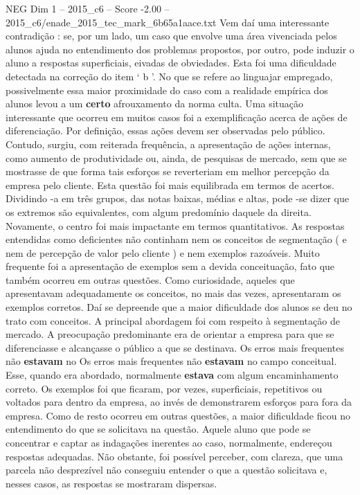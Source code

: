\begin{textsample}{NEG Dim 1 – 2015\_c6 – Score -2.00 – 2015\_c6/enade\_2015\_tec\_mark\_6b65a1aace.txt}
Vem daí uma interessante contradição : se, por um lado, um caso que envolve uma área vivenciada pelos alunos ajuda no entendimento dos problemas propostos, por outro, pode induzir o aluno a respostas superficiais, eivadas de obviedades.
Esta foi uma dificuldade detectada na correção do item ‘ b ’.
No que se refere ao linguajar empregado, possivelmente essa maior proximidade do caso com a realidade empírica dos alunos levou a um \textbf{certo} afrouxamento da norma culta.
Uma situação interessante que ocorreu em muitos casos foi a exemplificação acerca de ações de diferenciação.
Por definição, essas ações devem ser observadas pelo público.
Contudo, surgiu, com reiterada frequência, a apresentação de ações internas, como aumento de produtividade ou, ainda, de pesquisas de mercado, sem que se mostrasse de que forma tais esforços se reverteriam em melhor percepção da empresa pelo cliente.
Esta questão foi mais equilibrada em termos de acertos.
Dividindo -a em três grupos, das notas baixas, médias e altas, pode -se dizer que os extremos são equivalentes, com algum predomínio daquele da direita.
Novamente, o centro foi mais impactante em termos quantitativos.
As respostas entendidas como deficientes não continham nem os conceitos de segmentação ( e nem de percepção de valor pelo cliente ) e nem exemplos razoáveis.
Muito frequente foi a apresentação de exemplos sem a devida conceituação, fato que também ocorreu em outras questões.
Como curiosidade, aqueles que apresentavam adequadamente os conceitos, no mais das vezes, apresentaram os exemplos corretos.
Daí se depreende que a maior dificuldade dos alunos se deu no trato com conceitos.
A principal abordagem foi com respeito à segmentação de mercado.
A preocupação predominante era de orientar a empresa para que se diferenciasse e alcançasse o público a que se destinava.
Os erros mais frequentes não \textbf{estavam} no Os erros mais frequentes não \textbf{estavam} no campo conceitual.
Esse, quando era abordado, normalmente \textbf{estava} com algum encaminhamento correto.
Os exemplos foi que ficaram, por vezes, superficiais, repetitivos ou voltados para dentro da empresa, ao invés de demonstrarem esforços para fora da empresa.
Como de resto ocorreu em outras questões, a maior dificuldade ficou no entendimento do que se solicitava na questão.
Aquele aluno que pode se concentrar e captar as indagações inerentes ao caso, normalmente, endereçou respostas adequadas.
Não obstante, foi possível perceber, com clareza, que uma parcela não desprezível não conseguiu entender o que a questão solicitava e, nesses casos, as respostas se mostraram dispersas.

\end{textsample}
